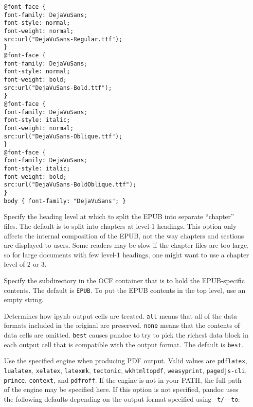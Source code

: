 \documentclass[
]{article}
\begin{document}
\begin{description}
\begin{verbatim}
@font-face {
font-family: DejaVuSans;
font-style: normal;
font-weight: normal;
src:url("DejaVuSans-Regular.ttf");
}
@font-face {
font-family: DejaVuSans;
font-style: normal;
font-weight: bold;
src:url("DejaVuSans-Bold.ttf");
}
@font-face {
font-family: DejaVuSans;
font-style: italic;
font-weight: normal;
src:url("DejaVuSans-Oblique.ttf");
}
@font-face {
font-family: DejaVuSans;
font-style: italic;
font-weight: bold;
src:url("DejaVuSans-BoldOblique.ttf");
}
body { font-family: "DejaVuSans"; }
\end{verbatim}
\item[\texttt{-\/-epub-chapter-level=}\emph{NUMBER}]
Specify the heading level at which to split the EPUB into separate
``chapter'' files. The default is to split into chapters at level-1
headings. This option only affects the internal composition of the EPUB,
not the way chapters and sections are displayed to users. Some readers
may be slow if the chapter files are too large, so for large documents
with few level-1 headings, one might want to use a chapter level of 2 or
3.
\item[\texttt{-\/-epub-subdirectory=}\emph{DIRNAME}]
Specify the subdirectory in the OCF container that is to hold the
EPUB-specific contents. The default is \texttt{EPUB}. To put the EPUB
contents in the top level, use an empty string.
\item[\texttt{-\/-ipynb-output=all\textbar{}none\textbar{}best}]
Determines how ipynb output cells are treated. \texttt{all} means that
all of the data formats included in the original are preserved.
\texttt{none} means that the contents of data cells are omitted.
\texttt{best} causes pandoc to try to pick the richest data block in
each output cell that is compatible with the output format. The default
is \texttt{best}.
\item[\texttt{-\/-pdf-engine=}\emph{PROGRAM}]
Use the specified engine when producing PDF output. Valid values are
\texttt{pdflatex}, \texttt{lualatex}, \texttt{xelatex},
\texttt{latexmk}, \texttt{tectonic}, \texttt{wkhtmltopdf},
\texttt{weasyprint}, \texttt{pagedjs-cli}, \texttt{prince},
\texttt{context}, and \texttt{pdfroff}. If the engine is not in your
PATH, the full path of the engine may be specified here. If this option
is not specified, pandoc uses the following defaults depending on the
output format specified using \texttt{-t/-\/-to}:


\end{description}
\end{document}
